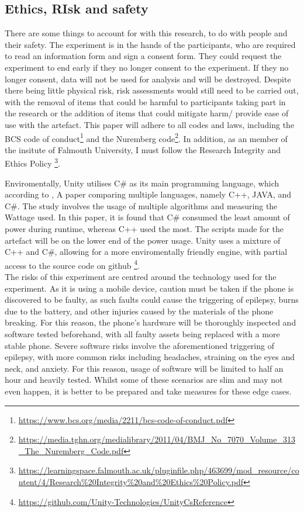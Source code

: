 \documentclass[conference]{IEEEtran}
\begin{document}
\subsection{Ethics, RIsk and safety}
There are some things to account for with this research, to do with people and their safety. The experiment is in the hands of the participants, who are required to read an information form and sign a consent form. They could request the experiment to end early if they no longer consent to the experiment.  If they no longer consent, data will not be used for analysis and will be destroyed. Despite there being little physical risk, risk assessments would still need to be carried out, with the removal of items that could be harmful to participants taking part in the research or the addition of items that could mitigate harm/ provide ease of use with the artefact. This paper will adhere to all codes and laws, including the BCS code of conduct\footnote{\url{https://www.bcs.org/media/2211/bcs-code-of-conduct.pdf}} and the Nuremberg code\footnote{\url{https://media.tghn.org/medialibrary/2011/04/BMJ_No_7070_Volume_313_The_Nuremberg_Code.pdf}}. In addition, as an member of the insitute of Falmouth University, I must follow the Research Integrity and Ethics Policy \footnote{\url{https://learningspace.falmouth.ac.uk/pluginfile.php/463699/mod_resource/content/4/Research\%20Integrity\%20and\%20Ethics\%20Policy.pdf}}. 

Enviromentally, Unity utilises C\# as its main programming language, which according to \cite{Jain2020}, A paper comparing multiple languages, namely C++, JAVA, and C\#. The study involves the usage of multiple algorithms and measuring the Wattage used. In this paper, it is found that C\# consumed the least amount of power during runtime, whereas C++ used the most. The scripts made for the artefact will be on the lower end of the power usage. Unity uses a mixture of C++ and C\#, allowing for a more enviromentally friendly engine, with partial access to the source code on github \footnote{\url{https://github.com/Unity-Technologies/UnityCsReference}}.\\

The risks of this experiment are centred around the technology used for the experiment. As it is using a mobile device, caution must be taken if the phone is discovered to be faulty, as such faults could cause the triggering of epilepsy, burns due to the battery, and other injuries caused by the materials of the phone breaking. For this reason, the phone's hardware will be thoroughly inspected and software tested beforehand, with all faulty assets being replaced with a more stable phone. Severe software risks involve the aforementioned triggering of epilepsy, with more common risks including headaches, straining on the eyes and neck, and anxiety. For this reason, usage of software will be limited to half an hour and heavily tested. Whilst some of these scenarios are slim and may not even happen, it is better to be prepared and take measures for these edge cases.\\
\end{document}
